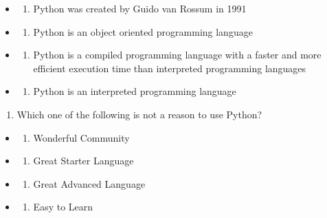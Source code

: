 \documentclass[
]{article}
\providecommand{\tightlist}{%
  \setlength{\itemsep}{0pt}\setlength{\parskip}{0pt}}
\begin{document}
\begin{itemize}
\item
  \begin{enumerate}
  \def\labelenumi{\alph{enumi}.}
  \tightlist
  \item
    Python was created by Guido van Rossum in 1991
  \end{enumerate}
\item
  \begin{enumerate}
  \def\labelenumi{\alph{enumi}.}
  \setcounter{enumi}{1}
  \tightlist
  \item
    Python is an object oriented programming language
  \end{enumerate}
\item
  \begin{enumerate}
  \def\labelenumi{\alph{enumi}.}
  \setcounter{enumi}{2}
  \tightlist
  \item
    Python is a compiled programming language with a faster and more
    efficient execution time than interpreted programming languages
  \end{enumerate}
\item
  \begin{enumerate}
  \def\labelenumi{\alph{enumi}.}
  \setcounter{enumi}{3}
  \tightlist
  \item
    Python is an interpreted programming language
  \end{enumerate}
\end{itemize}

\begin{enumerate}
\def\labelenumi{\arabic{enumi}.}
\setcounter{enumi}{3}
\tightlist
\item
  Which one of the following is not a reason to use Python?
\end{enumerate}

\begin{itemize}
\item
  \begin{enumerate}
  \def\labelenumi{\alph{enumi}.}
  \tightlist
  \item
    Wonderful Community
  \end{enumerate}
\item
  \begin{enumerate}
  \def\labelenumi{\alph{enumi}.}
  \setcounter{enumi}{1}
  \tightlist
  \item
    Great Starter Language
  \end{enumerate}
\item
  \begin{enumerate}
  \def\labelenumi{\alph{enumi}.}
  \setcounter{enumi}{2}
  \tightlist
  \item
    Great Advanced Language
  \end{enumerate}
\item
  \begin{enumerate}
  \def\labelenumi{\alph{enumi}.}
  \setcounter{enumi}{3}
  \tightlist
  \item
    Easy to Learn
  \end{enumerate}
\end{itemize}
\end{document}
